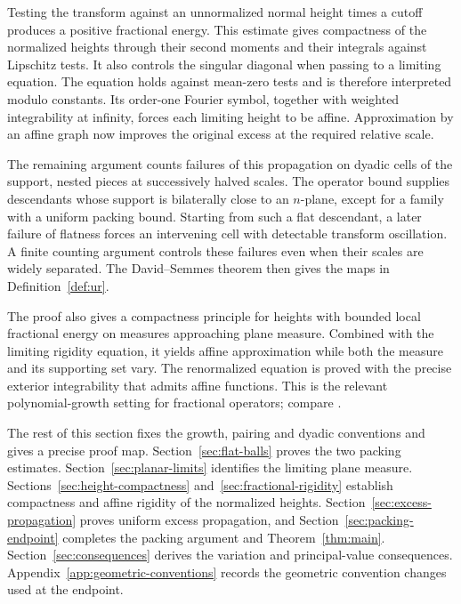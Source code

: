 Testing the transform against an unnormalized normal height times a
cutoff produces a positive fractional energy. This estimate gives
compactness of the normalized heights through their second moments
and their integrals against Lipschitz tests. It also controls the
singular diagonal when passing to a limiting equation. The equation
holds against mean-zero tests and is therefore interpreted modulo
constants. Its order-one Fourier symbol, together with weighted
integrability at infinity, forces each limiting height to be affine. Approximation
by an affine graph now improves the original excess at the required
relative scale.

The remaining argument counts failures of this propagation on dyadic
cells of the support, nested pieces at successively halved scales.
The operator bound supplies descendants whose support is bilaterally
close to an $n$-plane, except for a family with a uniform packing bound.
Starting from such a flat descendant, a later failure of flatness forces
an intervening cell with detectable transform oscillation. A finite
counting argument controls these failures even when their scales are
widely separated. The David--Semmes theorem then gives the maps in
Definition~\ref{def:ur}.

The proof also gives a compactness principle for heights with bounded
local fractional energy on measures approaching plane measure. Combined
with the limiting rigidity equation, it yields affine approximation
while both the measure and its supporting set vary.
The renormalized equation is proved with the precise exterior
integrability that admits affine functions. This is the relevant
polynomial-growth setting for fractional operators; compare
\cite{DipierroSavinValdinoci2019}.

The rest of this section fixes the growth, pairing and dyadic conventions
and gives a precise proof map. Section~\ref{sec:flat-balls} proves the two packing estimates.
Section~\ref{sec:planar-limits} identifies the limiting plane measure.
Sections~\ref{sec:height-compactness} and~\ref{sec:fractional-rigidity}
establish compactness and affine rigidity of the normalized heights.
Section~\ref{sec:excess-propagation} proves uniform excess propagation,
and Section~\ref{sec:packing-endpoint} completes the packing argument
and Theorem~\ref{thm:main}. Section~\ref{sec:consequences} derives the
variation and principal-value consequences. Appendix~\ref{app:geometric-conventions}
records the geometric convention changes used at the endpoint.
